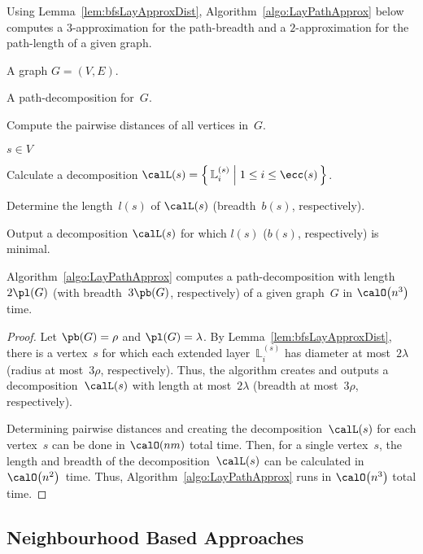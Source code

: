 Using Lemma~\ref{lem:bfsLayApproxDist}, Algorithm~\ref{algo:LayPathApprox} below computes a $3$-approximation for the path-breadth and a $2$-approximation for the path-length of a given graph.

\begin{algorithm}
    [htb]
    \caption
    {%
        A $2$-approximation algorithm for computing the path-length of a graph (respectively, $3$-approximation for path-breadth).
    }
    \label{algo:LayPathApprox}

\KwIn
{%
    A graph $G = (V, E)$.
}

\KwOut
{%
    A path-decomposition for~$G$.
}

Compute the pairwise distances of all vertices in~$G$.

\ForEach
{%
    $s \in V$
}
{%
    Calculate a decomposition $\calL(s) = \left \{ \, \mathbb{L}_i^{(s)} \Bigm| 1 \leq i \leq \ecc(s) \, \right \}$.

    Determine the length~$l(s)$ of $\calL(s)$ (breadth~$b(s)$, respectively).
}

Output a decomposition $\calL(s)$ for which $l(s)$ ($b(s)$, respectively) is minimal.
\end{algorithm}

\begin{theorem}
    \label{theo:algoLayPathApprox}
Algorithm~\ref{algo:LayPathApprox} computes a path-decomposition with length~\( 2 \pl(G) \) (with breadth~\( 3 \pb(G) \), respectively) of a given graph~\( G \) in \( \calO \big( n^3 \big) \) time.
\end{theorem}

\begin{proof}
Let $\pb(G) = \rho$ and $\pl(G) = \lambda$.
By Lemma~\ref{lem:bfsLayApproxDist}, there is a vertex~$s$ for which each extended layer~$\mathbb{L}_i^{(s)}$ has diameter at most~$2 \lambda$ (radius at most~$3 \rho$, respectively).
Thus, the algorithm creates and outputs a decomposition~$\calL(s)$ with length at most~$2 \lambda$ (breadth at most~$3 \rho$, respectively).

Determining pairwise distances and creating the decomposition~$\calL(s)$ for each vertex~$s$ can be done in $\calO(nm)$ total time.
Then, for a single vertex~$s$, the length and breadth of the decomposition~$\calL(s)$ can be calculated in $\calO \big( n^2 \big)$~time.
Thus, Algorithm~\ref{algo:LayPathApprox} runs in $\calO \big( n^3 \big)$ total time.
\end{proof}

\subsection{Neighbourhood Based Approaches}

